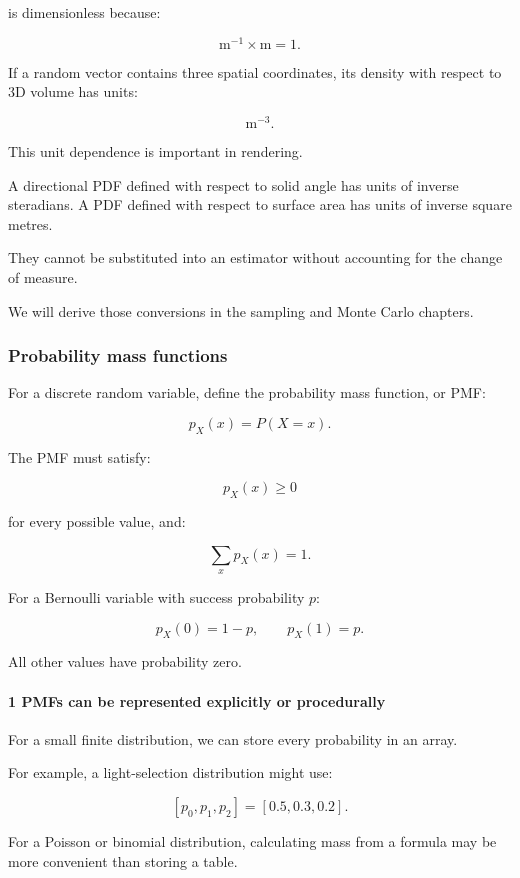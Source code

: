 is dimensionless because:

\[
 \mathrm m^{-1}\times\mathrm m=1.
\]

If a random vector contains three spatial coordinates, its density with respect to 3D volume has units:

\[
 \mathrm m^{-3}.
\]

This unit dependence is important in rendering.

A directional PDF defined with respect to solid angle has units of inverse steradians. A PDF defined with respect to surface area has units of inverse square metres.

They cannot be substituted into an estimator without accounting for the change of measure.

We will derive those conversions in the sampling and Monte Carlo chapters.

\subsubsection{Probability mass functions}\label{probability-mass-functions}

For a discrete random variable, define the probability mass function, or PMF:

\[
 \boxed{ p_X(x)=P(X=x) }.
\]

The PMF must satisfy:

\[
 p_X(x)\ge0
\]

for every possible value, and:

\[
 \boxed{ \sum_xp_X(x)=1 }.
\]

For a Bernoulli variable with success probability \(p\):

\[
 p_X(0)=1-p, \qquad p_X(1)=p.
\]

All other values have probability zero.

\paragraph{1 PMFs can be represented explicitly or procedurally}\label{pmfs-can-be-represented-explicitly-or-procedurally}

For a small finite distribution, we can store every probability in an array.

For example, a light-selection distribution might use:

\[
 [p_0,p_1,p_2]=[0.5,0.3,0.2].
\]

For a Poisson or binomial distribution, calculating mass from a formula may be more convenient than storing a table.


